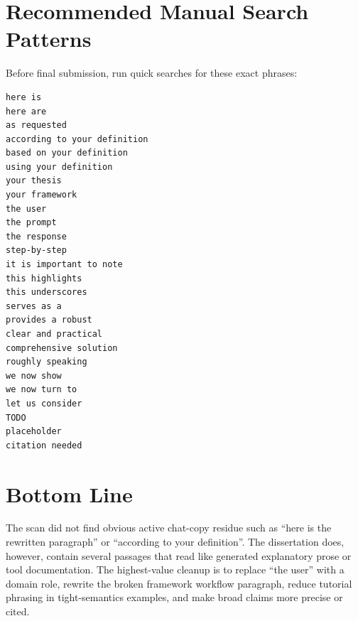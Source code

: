 \documentclass[11pt,a4paper]{article}
\begin{document}
\section*{Recommended Manual Search Patterns}

Before final submission, run quick searches for these exact phrases:

\begin{verbatim}
here is
here are
as requested
according to your definition
based on your definition
using your definition
your thesis
your framework
the user
the prompt
the response
step-by-step
it is important to note
this highlights
this underscores
serves as a
provides a robust
clear and practical
comprehensive solution
roughly speaking
we now show
we now turn to
let us consider
TODO
placeholder
citation needed
\end{verbatim}

\section*{Bottom Line}

The scan did not find obvious active chat-copy residue such as ``here is the
rewritten paragraph'' or ``according to your definition''. The dissertation does,
however, contain several passages that read like generated explanatory prose or
tool documentation. The highest-value cleanup is to replace ``the user'' with a
domain role, rewrite the broken framework workflow paragraph, reduce tutorial
phrasing in tight-semantics examples, and make broad claims more precise or cited.
\end{document}
